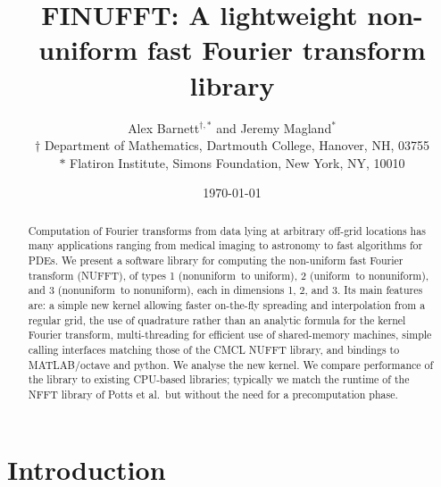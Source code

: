 \documentclass[10pt]{article}
\newcommand{\NU}{{nonuniform}}
\newcommand{\U}{{uniform}}
\begin{document}
\title{FINUFFT: A lightweight non-uniform fast Fourier transform library}
\author{Alex Barnett$^{\dag,\ast}$ and Jeremy Magland$^\ast$\\
  $\dag$ Department of Mathematics, Dartmouth College,
    Hanover, NH, 03755 \\
    $\ast$ Flatiron Institute, Simons Foundation,
    New York, NY, 10010
    }
\date{\today}
\maketitle
\begin{abstract}
  Computation of Fourier transforms from data lying at arbitrary
  off-grid locations has many applications ranging from medical
  imaging to astronomy to fast algorithms for PDEs.  We present a
  software library for computing the non-uniform fast Fourier transform
  (NUFFT),
  of types 1 (\NU\ to \U), 2 (\U\ to \NU), and
  3 (\NU\ to \NU), each in dimensions 1, 2, and 3.  Its
  main features are: a simple new kernel allowing faster on-the-fly
  spreading and interpolation from a regular grid, the use of
  quadrature rather than an analytic formula for the kernel Fourier
  transform, multi-threading for efficient use of shared-memory
  machines, simple calling interfaces matching those of the CMCL
  NUFFT library, and bindings to MATLAB/octave and python.
  We analyse the new kernel.
  We
  compare performance of the library to existing CPU-based libraries; typically
  we match the runtime of the NFFT library of Potts et al.\ but
  without the need for a precomputation phase.
\end{abstract}




\section{Introduction}
\end{document}
